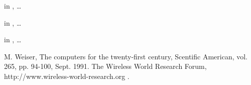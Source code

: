\documentclass[a4paper,12pt]{article}
\begin{document}
in \cite{bib:ubi91weiser}, \ldots

in \cite{bib:ubi91weiser,bib:wwrf}, \ldots

in \cite[pp. 99-105]{bib:wwrf}, \ldots

\begin{thebibliography}{10}
  M. Weiser, 
  The computers for the twenty-first century, 
  Scentific American, 
  vol. 265, pp. 94-100, Sept. 1991.
  The Wireless World Research Forum, 
  http://www.wireless-world-research.org .
\end{thebibliography}
\end{document}
